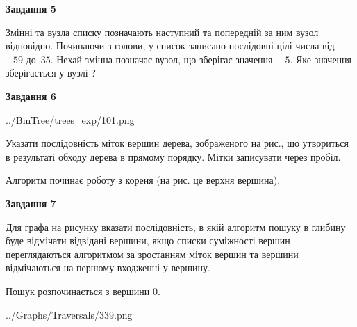 \documentclass[12pt, ukrainian]{article}
\begin{document}
{\begin {large}
{\begin {center}\textbf{Завдання 5}\end {center}}\par
Змінні  та  вузла списку позначають наступний та попередній за ним вузол відповідно. Починаючи з голови, у список записано послідовні цілі числа від~$-59$ до~$35$. Нехай змінна  позначає вузол, що зберігає значення~$-5$.
Яке значення зберігається у вузлі  ?\par
\newpage

{\begin {center}\textbf{Завдання 6}\end {center}}\par

\begin{center}
	{../BinTree/trees_exp/101.png}
\end{center}
Указати послідовність міток вершин дерева, зображеного на рис., що утвориться в результаті обходу дерева в прямому порядку. Мітки записувати через пробіл.\par Алгоритм починає роботу з кореня (на рис. це верхня вершина).\par
\newpage

{\begin {center}\textbf{Завдання 7}\end {center}}\par
Для графа на рисунку вказати послідовність, в якій алгоритм пошуку в глибину буде відмічати відвідані вершини, якщо списки суміжності вершин переглядаються алгоритмом за зростанням міток вершин та вершини відмічаються на першому вход\-женні у вершину.\par
Пошук розпочинається з вершини 0.\par

\begin{center}
	{../Graphs/Traversals/339.png}
\end{center}\par
\newpage


\end{large}}
\end{document}
